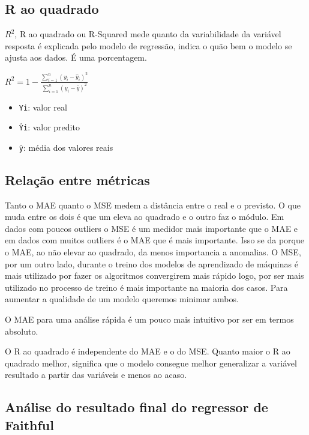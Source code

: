 \documentclass[
  letterpaper,
  DIV=11,
  numbers=noendperiod]{scrreprt}
\providecommand{\tightlist}{%
  \setlength{\itemsep}{0pt}\setlength{\parskip}{0pt}}\usepackage{longtable,booktabs,array}
\begin{document}
\hypertarget{r-ao-quadrado}{%
\subsection{R ao quadrado}\label{r-ao-quadrado}}

\(R^2\), R ao quadrado ou R-Squared mede quanto da variabilidade da
variável resposta é explicada pelo modelo de regressão, indica o quão
bem o modelo se ajusta aos dados. É uma porcentagem.

\(R^2 = 1 - \frac{\sum_{i=1}^{n}(y_i - \hat{y}_i)^2}{\sum_{i=1}^{n}(y_i - \bar{y})^2}\)

\begin{itemize}
\tightlist
\item
  \texttt{Yi}: valor real
\item
  \texttt{Ŷi}: valor predito
\item
  \texttt{ȳ}: média dos valores reais
\end{itemize}

\hypertarget{relauxe7uxe3o-entre-muxe9tricas-1}{%
\subsection{Relação entre
métricas}\label{relauxe7uxe3o-entre-muxe9tricas-1}}

Tanto o MAE quanto o MSE medem a distância entre o real e o previsto. O
que muda entre os dois é que um eleva ao quadrado e o outro faz o
módulo. Em dados com poucos outliers o MSE é um medidor mais importante
que o MAE e em dados com muitos outliers é o MAE que é mais importante.
Isso se da porque o MAE, ao não elevar ao quadrado, da menos importancia
a anomalias. O MSE, por um outro lado, durante o treino dos modelos de
aprendizado de máquinas é mais utilizado por fazer os algoritmos
convergirem mais rápido logo, por ser mais utilizado no processo de
treino é mais importante na maioria dos casos. Para aumentar a qualidade
de um modelo queremos minimar ambos.

O MAE para uma análise rápida é um pouco mais intuitivo por ser em
termos absoluto.

O R ao quadrado é independente do MAE e o do MSE. Quanto maior o R ao
quadrado melhor, significa que o modelo consegue melhor generalizar a
variável resultado a partir das variáveis e menos ao acaso.

\hypertarget{anuxe1lise-do-resultado-final-do-regressor-de-faithful}{%
\subsection{Análise do resultado final do regressor de
Faithful}\label{anuxe1lise-do-resultado-final-do-regressor-de-faithful}}
\end{document}
